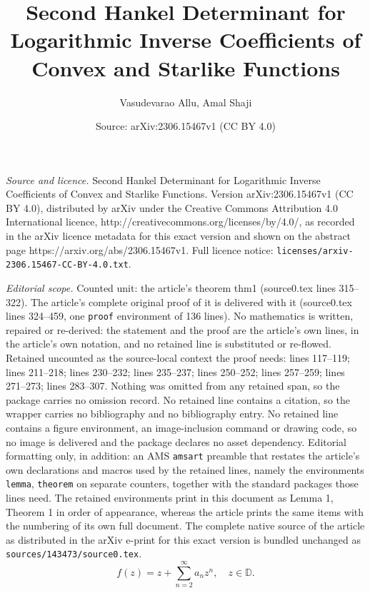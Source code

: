 \documentclass[10pt,a4paper]{amsart}
\title{Second Hankel Determinant for Logarithmic Inverse Coefficients of Convex and Starlike Functions}
\author{Vasudevarao Allu, Amal Shaji}
\date{Source: arXiv:2306.15467v1 (CC BY 4.0)}
\begin{document}
\maketitle

\noindent\emph{Source and licence.} Second Hankel Determinant for Logarithmic Inverse Coefficients of Convex and Starlike Functions. Version arXiv:2306.15467v1 (CC BY 4.0), distributed by arXiv under the Creative Commons Attribution 4.0 International licence, http://creativecommons.org/licenses/by/4.0/, as recorded in the arXiv licence metadata for this exact version and shown on the abstract page https://arxiv.org/abs/2306.15467v1. Full licence notice: \texttt{licenses/arxiv-2306.15467-CC-BY-4.0.txt}.\par\smallskip

\noindent\textit{Editorial scope.} Counted unit: the article's theorem thm1 (source0.tex lines 315--322). The article's complete original proof of it is delivered with it (source0.tex lines 324--459, one \texttt{proof} environment of 136 lines). No mathematics is written, repaired or re-derived: the statement and the proof are the article's own lines, in the article's own notation, and no retained line is substituted or re-flowed.  Retained uncounted as the source-local context the proof needs: lines 117--119; lines 211--218; lines 230--232; lines 235--237; lines 250--252; lines 257--259; lines 271--273; lines 283--307.  Nothing was omitted from any retained span, so the package carries no omission record.  No retained line contains a citation, so the wrapper carries no bibliography and no bibliography entry.  No retained line contains a figure environment, an image-inclusion command or drawing code, so no image is delivered and the package declares no asset dependency.  Editorial formatting only, in addition: an AMS \texttt{amsart} preamble that restates the article's own declarations and macros used by the retained lines, namely the environments \texttt{lemma}, \texttt{theorem} on separate counters, together with the standard packages those lines need.  The retained environments print in this document as Lemma 1, Theorem 1 in order of appearance, whereas the article prints the same items with the numbering of its own full document.  The complete native source of the article as distributed in the arXiv e-print for this exact version is bundled unchanged as \texttt{sources/143473/source0.tex}.
\begin{equation}\label{f}
	f(z)= z+\sum_{n=2}^{\infty}a_n z^n, \quad z\in \mathbb{D}.
\end{equation}
\end{document}
